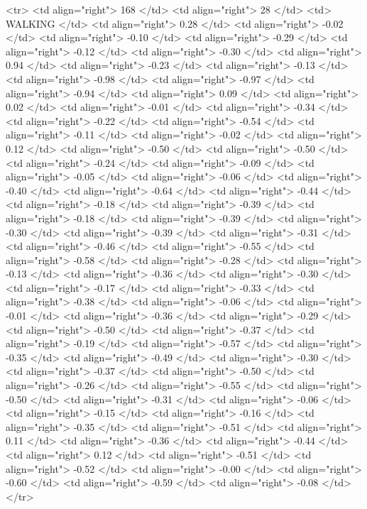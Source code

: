   <tr> <td align="right"> 168 </td> <td align="right">  28 </td> <td> WALKING </td> <td align="right"> 0.28 </td> <td align="right"> -0.02 </td> <td align="right"> -0.10 </td> <td align="right"> -0.29 </td> <td align="right"> -0.12 </td> <td align="right"> -0.30 </td> <td align="right"> 0.94 </td> <td align="right"> -0.23 </td> <td align="right"> -0.13 </td> <td align="right"> -0.98 </td> <td align="right"> -0.97 </td> <td align="right"> -0.94 </td> <td align="right"> 0.09 </td> <td align="right"> 0.02 </td> <td align="right"> -0.01 </td> <td align="right"> -0.34 </td> <td align="right"> -0.22 </td> <td align="right"> -0.54 </td> <td align="right"> -0.11 </td> <td align="right"> -0.02 </td> <td align="right"> 0.12 </td> <td align="right"> -0.50 </td> <td align="right"> -0.50 </td> <td align="right"> -0.24 </td> <td align="right"> -0.09 </td> <td align="right"> -0.05 </td> <td align="right"> -0.06 </td> <td align="right"> -0.40 </td> <td align="right"> -0.64 </td> <td align="right"> -0.44 </td> <td align="right"> -0.18 </td> <td align="right"> -0.39 </td> <td align="right"> -0.18 </td> <td align="right"> -0.39 </td> <td align="right"> -0.30 </td> <td align="right"> -0.39 </td> <td align="right"> -0.31 </td> <td align="right"> -0.46 </td> <td align="right"> -0.55 </td> <td align="right"> -0.58 </td> <td align="right"> -0.28 </td> <td align="right"> -0.13 </td> <td align="right"> -0.36 </td> <td align="right"> -0.30 </td> <td align="right"> -0.17 </td> <td align="right"> -0.33 </td> <td align="right"> -0.38 </td> <td align="right"> -0.06 </td> <td align="right"> -0.01 </td> <td align="right"> -0.36 </td> <td align="right"> -0.29 </td> <td align="right"> -0.50 </td> <td align="right"> -0.37 </td> <td align="right"> -0.19 </td> <td align="right"> -0.57 </td> <td align="right"> -0.35 </td> <td align="right"> -0.49 </td> <td align="right"> -0.30 </td> <td align="right"> -0.37 </td> <td align="right"> -0.50 </td> <td align="right"> -0.26 </td> <td align="right"> -0.55 </td> <td align="right"> -0.50 </td> <td align="right"> -0.31 </td> <td align="right"> -0.06 </td> <td align="right"> -0.15 </td> <td align="right"> -0.16 </td> <td align="right"> -0.35 </td> <td align="right"> -0.51 </td> <td align="right"> 0.11 </td> <td align="right"> -0.36 </td> <td align="right"> -0.44 </td> <td align="right"> 0.12 </td> <td align="right"> -0.51 </td> <td align="right"> -0.52 </td> <td align="right"> -0.00 </td> <td align="right"> -0.60 </td> <td align="right"> -0.59 </td> <td align="right"> -0.08 </td> </tr>
